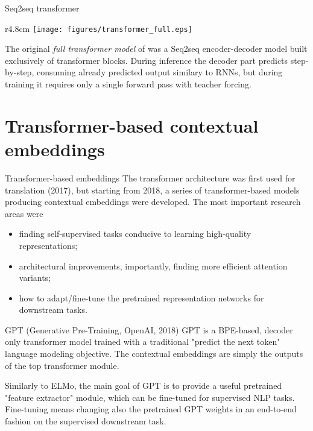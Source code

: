 \documentclass[style=upen, size=14pt]{powerdot}
\theoremstyle{definition}
\begin{document}
\begin{slide}[toc=Seq2seq]{Seq2seq transformer}
    \begin{wrapfigure}{r}{4.8cm}
    \texttt{[image: figures/transformer\_full.eps]}
  \end{wrapfigure}
  The original \emph{full transformer model} of \citep{vaswani2017attention} was
  a Seq2seq encoder-decoder model built exclusively of transformer blocks.
  During inference the decoder part predicts step-by-step, consuming already
  predicted output similary to RNNs, but during training it requires only a
  single forward pass with teacher forcing.
\end{slide}

\section{Transformer-based contextual embeddings}

\begin{slide}[toc=Introduction]{Transformer-based embeddings}
  The transformer architecture was first used for translation (2017), but
  starting from 2018, a series of transformer-based models producing contextual
  embeddings were developed. The most important research areas were
  \begin{itemize}
  \item finding self-supervised tasks conducive to learning high-quality
    representations;
  \item architectural improvements, importantly, finding more efficient attention variants;
  \item how to adapt/fine-tune the pretrained representation networks for
    downstream tasks.
  \end{itemize}
\end{slide}

\begin{slide}[toc=GPT]{GPT (Generative Pre-Training, OpenAI, 2018)}
  GPT is a BPE-based, decoder only transformer model trained with a
  traditional "predict the next token" language modeling objective. The
  contextual embeddings are simply the outputs of the top transformer module.\bigskip

  Similarly to ELMo, the main goal of GPT is to provide a useful pretrained
  "feature extractor" module, which can be fine-tuned for supervised NLP tasks.
  Fine-tuning means changing also the pretrained GPT weights in an end-to-end
  fashion on the supervised downstream task.
\end{slide}
\end{document}
